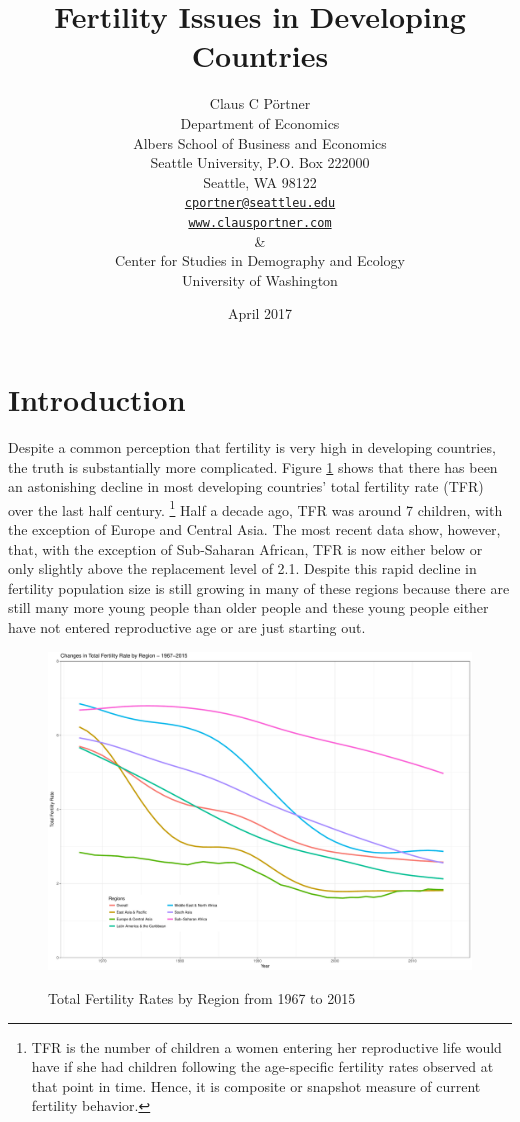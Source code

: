 \documentclass[letterpaper,12pt]{article}
\title{Fertility Issues in Developing Countries}
\author{Claus C P\"ortner\\
    Department of Economics\\
    Albers School of Business and Economics\\
    Seattle University, P.O. Box 222000\\
    Seattle, WA 98122\\
    \href{mailto:cportner@seattleu.edu}{\texttt{cportner@seattleu.edu}}\\
    \href{http://www.clausportner.com}{\texttt{www.clausportner.com}}\\
    \& \\
    Center for Studies in Demography and Ecology \\
    University of Washington\\ \vspace{2cm}
    }
\date{April 2017}
\begin{document}
\maketitle
\thispagestyle{empty}


\newpage

\section{Introduction}

Despite a common perception that fertility is very high in developing countries,
the truth is substantially more complicated.
Figure \ref{fig:TFR} shows that there has been an astonishing decline in 
most developing countries' total fertility rate (TFR) over the last half 
century.%
\footnote{
TFR is the number of children a women entering her reproductive life
would have if she had children following the age-specific fertility
rates observed at that point in time.
Hence, it is composite or snapshot measure of current fertility
behavior.
}
Half a decade ago, TFR was around 7 children, with the exception
of Europe and Central Asia.
The most recent data show, however, that, with the exception of 
Sub-Saharan African, TFR is now either below or only slightly 
above the replacement level of 2.1.
Despite this rapid decline in fertility population size is still
growing in many of these regions because there are still many
more young people than older people and these young people either
have not entered reproductive age or are just starting out.

\begin{figure}[hp]
    \centering
    \caption{Total Fertility Rates by Region from 1967 to 2015}
    \includegraphics[width=0.75\linewidth]{../figures/totalFertilityRates.pdf}
    \label{fig:TFR}
\end{figure}
\end{document}
